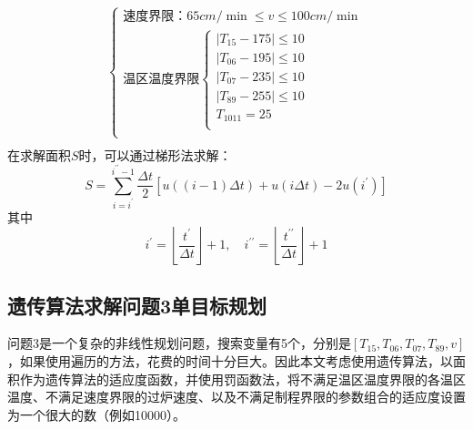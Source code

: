 \documentclass[withoutpreface,bwprint]{cumcmthesis} %
\begin{document}
\begin{equation}
\begin{gathered}
\begin{cases}
\text{速度界限：}65cm/\min \leqslant v\leqslant 100cm/\min\\
\text{温区温度界限}\begin{cases}
\left| T_{15}-175 \right|\leqslant 10\\
\left| T_{06}-195 \right|\leqslant 10\\
\left| T_{07}-235 \right|\leqslant 10\\
\left| T_{89}-255 \right|\leqslant 10\\
T_{1011}=25\\
\end{cases}\\
\end{cases}\\
\end{gathered}
\end{equation}
在求解面积$S$时，可以通过梯形法求解：
\begin{equation}
S=\sum_{i=i^{\prime}}^{i^{\prime \prime}-1} \frac{\Delta t}{2}\left[u((i-1) \Delta t)+u(i \Delta t)-2 u\left(i^{\prime}\right)\right]
\end{equation}
其中\begin{equation}
i^{\prime}=\left\lfloor\frac{t^{\prime}}{\Delta t}\right\rfloor+1, \quad i^{\prime \prime}=\left\lfloor\frac{t^{\prime \prime }}{\Delta t}\right\rfloor+1
\end{equation}
\subsection{遗传算法求解问题3单目标规划}
问题3是一个复杂的非线性规划问题，搜索变量有5个，分别是$[T_{15}, T_{06}, T_{0 7}, T_{89}, v]$，如果使用遍历的方法，花费的时间十分巨大。因此本文考虑使用遗传算法，以面积作为遗传算法的适应度函数，并使用罚函数法，将不满足温区温度界限的各温区温度、不满足速度界限的过炉速度、以及不满足制程界限的参数组合的适应度设置为一个很大的数（例如10000）。
\end{document}
